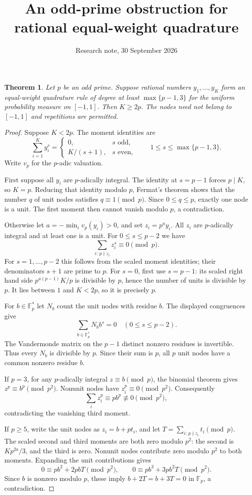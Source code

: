 \documentclass[11pt]{article}
\title{An odd-prime obstruction for rational equal-weight quadrature}
\author{Research note, 30 September 2026}
\date{}
\newtheorem{theorem}{Theorem}
\begin{document}
\maketitle

\begin{theorem}
Let $p$ be an odd prime. Suppose rational numbers $y_1,\ldots,y_K$
form an equal-weight quadrature rule of degree at least
$\max\{p-1,3\}$ for the
uniform probability measure on $[-1,1]$. Then $K\ge 2p$.
The nodes need not belong to $[-1,1]$ and repetitions are permitted.
\end{theorem}
\begin{proof}
Suppose $K<2p$. The moment identities are
\[
 \sum_{i=1}^K y_i^s=
 \begin{cases}0,&s\text{ odd},\\K/(s+1),&s\text{ even},\end{cases}
 \qquad 1\le s\le\max\{p-1,3\}.
\]
Write $v_p$ for the $p$-adic valuation.

First suppose all $y_i$ are $p$-adically integral.
The identity at $s=p-1$ forces $p\mid K$, so $K=p$.
Reducing that identity modulo $p$, Fermat's theorem shows that the
number $q$ of unit nodes satisfies $q\equiv1\pmod p$.
Since $0\le q\le p$, exactly one node is a unit.
The first moment then cannot vanish modulo $p$, a contradiction.

Otherwise let $a=-\min_i v_p(y_i)>0$, and set $z_i=p^a y_i$.
All $z_i$ are $p$-adically integral and at least one is a unit.
For $0\le s\le p-2$ we have
\[
 \sum_{i:\,p\nmid z_i} z_i^s\equiv0\pmod p.
\]
For $s=1,\ldots,p-2$ this follows from the scaled moment identities;
their denominators $s+1$ are prime to $p$.
For $s=0$, first use $s=p-1$: its scaled right hand side
$p^{a(p-1)}K/p$ is divisible by $p$, hence the number of units is
divisible by $p$.
It lies between $1$ and $K<2p$, so it is precisely $p$.

For $b\in\mathbb F_p^*$ let $N_b$ count the unit nodes with residue
$b$. The displayed congruences give
\[
 \sum_{b\in\mathbb F_p^*}N_b b^s=0
 \quad(0\le s\le p-2).
\]
The Vandermonde matrix on the $p-1$ distinct nonzero residues is
invertible. Thus every $N_b$ is divisible by $p$.
Since their sum is $p$, all $p$ unit nodes have a common nonzero
residue $b$.

If $p=3$, for any $p$-adically integral $z\equiv b\pmod p$,
the binomial theorem gives $z^p\equiv b^p\pmod {p^2}$.
Nonunit nodes have $z_i^p\equiv0\pmod {p^2}$.
Consequently
\[
 \sum_i z_i^p\equiv p b^p\not\equiv0\pmod {p^2},
\]
contradicting the vanishing third moment.

If $p\ge5$, write the unit nodes as $z_i=b+p t_i$, and let
$T=\sum_{i:\,p\nmid z_i}t_i\pmod p$.
The scaled second and third moments are both zero modulo $p^2$:
the second is $Kp^{2a}/3$, and the third is zero.
Nonunit nodes contribute zero modulo $p^2$ to both moments.
Expanding the unit contributions gives
\[
 0\equiv p b^2+2p bT\pmod {p^2},\qquad
 0\equiv p b^3+3p b^2T\pmod {p^2}.
\]
Since $b$ is nonzero modulo $p$, these imply $b+2T=b+3T=0$
in $\mathbb F_p$, a contradiction.
\end{proof}
\end{document}
